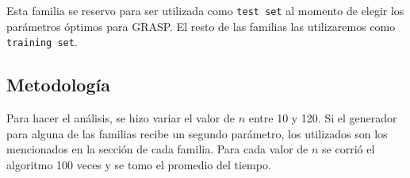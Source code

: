 Esta familia se reservo para ser utilizada como \texttt{test set} al momento de elegir los parámetros óptimos para GRASP. El resto de las familias las utilizaremos como \texttt{training set}.

\subsection{Metodología}

Para hacer el análisis, se hizo variar el valor de $n$ entre 10 y 120. Si el generador para alguna de las familias recibe un segundo parámetro, los utilizados son los mencionados en la sección de cada familia. Para cada valor de $n$ se corrió el algoritmo 100 veces y se tomo el promedio del tiempo.